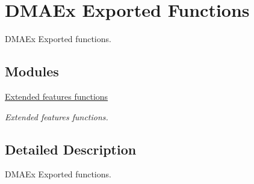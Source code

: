 \hypertarget{group___d_m_a_ex___exported___functions}{}\section{D\+M\+A\+Ex Exported Functions}
\label{group___d_m_a_ex___exported___functions}


D\+M\+A\+Ex Exported functions.  


\subsection*{Modules}
\begin{DoxyCompactItemize}
\item 
\hyperlink{group___d_m_a_ex___exported___functions___group1}{Extended features functions}
\begin{DoxyCompactList}\small\item\em Extended features functions. \end{DoxyCompactList}\end{DoxyCompactItemize}


\subsection{Detailed Description}
D\+M\+A\+Ex Exported functions. 

